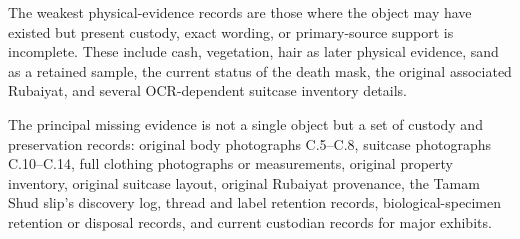 The weakest physical-evidence records are those where the object may have existed but present custody, exact wording, or primary-source support is incomplete. These include cash, vegetation, hair as later physical evidence, sand as a retained sample, the current status of the death mask, the original associated Rubaiyat, and several OCR-dependent suitcase inventory details.

The principal missing evidence is not a single object but a set of custody and preservation records: original body photographs C.5--C.8, suitcase photographs C.10--C.14, full clothing photographs or measurements, original property inventory, original suitcase layout, original Rubaiyat provenance, the Tamam Shud slip's discovery log, thread and label retention records, biological-specimen retention or disposal records, and current custodian records for major exhibits.

